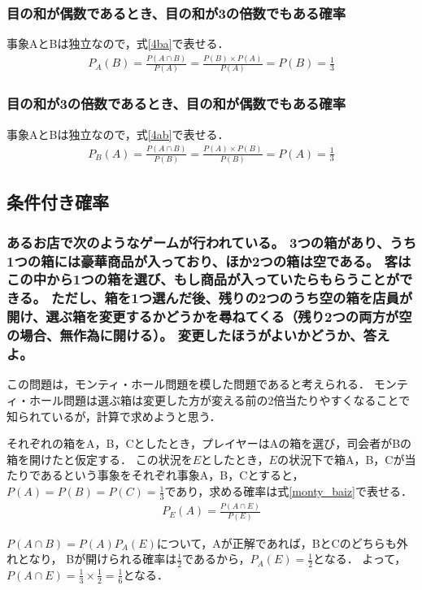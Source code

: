 \documentclass[titlepage,a4paper]{jsarticle}
\begin{document}
\subsubsection{目の和が偶数であるとき、目の和が3の倍数でもある確率}
事象AとBは独立なので，式\eqref{4ba}で表せる．
\begin{align}
  P_A(B)=\frac{P(A \cap B)}{P(A)}=\frac{P(B) \times P(A)}{P(A)} =P(B)=\frac{1}{3}\label{4ba}
\end{align}
\subsubsection{目の和が3の倍数であるとき、目の和が偶数でもある確率}
事象AとBは独立なので，式\eqref{4ab}で表せる．
\begin{align}
  P_B(A)=\frac{P(A \cap B)}{P(B)}=\frac{P(A) \times P(B)}{P(B)} =P(A)=\frac{1}{3}\label{4ab}
\end{align}

\subsection{条件付き確率}
\subsubsection*{あるお店で次のようなゲームが行われている。
  3つの箱があり、うち1つの箱には豪華商品が入っており、ほか2つの箱は空である。
  客はこの中から1つの箱を選び、もし商品が入っていたらもらうことができる。
  ただし、箱を1つ選んだ後、残りの2つのうち空の箱を店員が開け、選ぶ箱を変更するかどうかを尋ねてくる（残り2つの両方が空の場合、無作為に開ける）。
  変更したほうがよいかどうか、答えよ。}
この問題は，モンティ・ホール問題を模した問題であると考えられる．
モンティ・ホール問題は選ぶ箱は変更した方が変える前の2倍当たりやすくなることで知られているが，計算で求めようと思う．

それぞれの箱をA，B，Cとしたとき，プレイヤーはAの箱を選び，司会者がBの箱を開けたと仮定する．
この状況を$E$としたとき，$E$の状況下で箱A，B，Cが当たりであるという事象をそれぞれ事象A，B，Cとすると，
$P(A)=P(B)=P(C)=\frac{1}{3}$であり，求める確率は式\eqref{monty_baiz}で表せる．
\begin{align}
  P_E(A)=\frac{P(A\cap E)}{P(E)}\label{monty_baiz}
\end{align}

$P(A \cap B)=P(A)P_A(E)$について，Aが正解であれば，BとCのどちらも外れとなり，
Bが開けられる確率は$\frac{1}{2}$であるから，$P_A(E)=\frac{1}{2}$となる．
よって，$P(A \cap E) = \frac{1}{3} \times \frac{1}{2} = \frac{1}{6}$となる．
\end{document}
